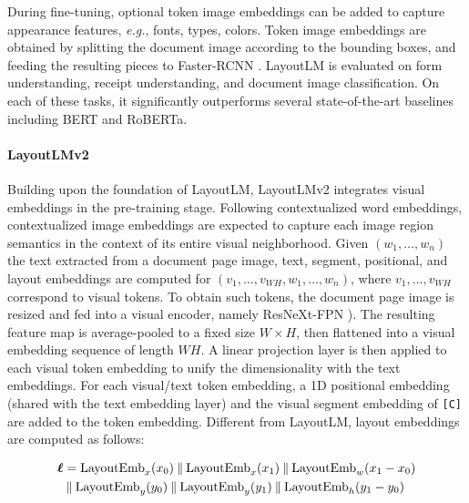 During fine-tuning, optional token image embeddings can be added to capture appearance features, \textit{e.g.}, fonts, types, colors. Token image embeddings are obtained by splitting the document image according to the bounding boxes, and feeding the resulting pieces to Faster-RCNN \citep{ren2015faster}. LayoutLM is evaluated on form understanding, receipt understanding, and document image classification. On each of these tasks, it significantly outperforms several state-of-the-art baselines including \ac{BERT} and \ac{RoBERTa}. 

\paragraph{LayoutLMv2}

Building upon the foundation of LayoutLM, LayoutLMv2 \citep{xu2020layoutlmv2} integrates visual embeddings in the pre-training stage. Following contextualized word embeddings, contextualized image embeddings are expected to capture each image region semantics in the context of its entire visual neighborhood. Given $(w_1, \ldots, w_n)$ the text extracted from a document page image, text, segment, positional, and layout embeddings are computed for $(v_1, \ldots, v_{WH}, w_1, \ldots, w_n)$, where $v_1, \ldots, v_{WH}$ correspond to visual tokens. To obtain such tokens, the document page image is resized and fed into a visual encoder, namely ResNeXt-FPN \citep{xie2017aggregated, lin2017feature}). The resulting feature map is average-pooled to a fixed size $W \times H$, then flattened into a visual embedding sequence of length $WH$. A linear projection layer is then applied to each visual token embedding to unify the dimensionality with the text embeddings. For each visual/text token embedding, a 1D positional embedding (shared with the text embedding layer) and the visual segment embedding of \texttt{[C]} are added to the token embedding. Different from LayoutLM, layout embeddings are computed as follows:

\begin{equation}
    \begin{split}
    \boldsymbol{\ell} & = \text{LayoutEmb}_x(x_0) \mathbin\Vert \text{LayoutEmb}_x(x_1) \mathbin\Vert \text{LayoutEmb}_w(x_1 - x_0) \\ 
    & \mathbin\Vert \text{LayoutEmb}_y(y_0) \mathbin\Vert \text{LayoutEmb}_y(y_1) \mathbin\Vert \text{LayoutEmb}_h(y_1 - y_0) \\
\end{split}
\end{equation}

